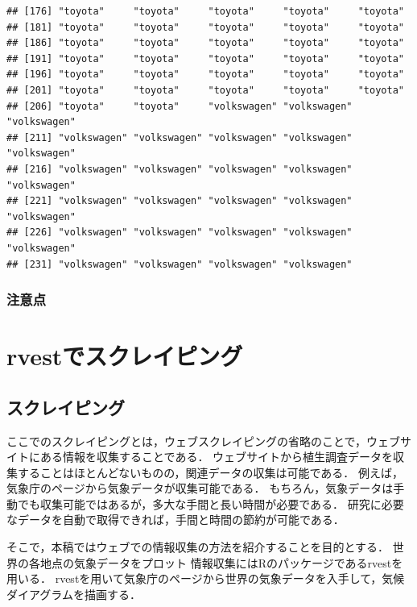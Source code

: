 \documentclass[
]{article}
\begin{document}
\begin{verbatim}
## [176] "toyota"     "toyota"     "toyota"     "toyota"     "toyota"    
## [181] "toyota"     "toyota"     "toyota"     "toyota"     "toyota"    
## [186] "toyota"     "toyota"     "toyota"     "toyota"     "toyota"    
## [191] "toyota"     "toyota"     "toyota"     "toyota"     "toyota"    
## [196] "toyota"     "toyota"     "toyota"     "toyota"     "toyota"    
## [201] "toyota"     "toyota"     "toyota"     "toyota"     "toyota"    
## [206] "toyota"     "toyota"     "volkswagen" "volkswagen" "volkswagen"
## [211] "volkswagen" "volkswagen" "volkswagen" "volkswagen" "volkswagen"
## [216] "volkswagen" "volkswagen" "volkswagen" "volkswagen" "volkswagen"
## [221] "volkswagen" "volkswagen" "volkswagen" "volkswagen" "volkswagen"
## [226] "volkswagen" "volkswagen" "volkswagen" "volkswagen" "volkswagen"
## [231] "volkswagen" "volkswagen" "volkswagen" "volkswagen"
\end{verbatim}

\hypertarget{ux6ce8ux610fux70b9-2}{%
\subsubsection{注意点}\label{ux6ce8ux610fux70b9-2}}

\hypertarget{rvest}{%
\section{rvestでスクレイピング}\label{rvest}}

\hypertarget{ux30b9ux30afux30ecux30a4ux30d4ux30f3ux30b0}{%
\subsection{スクレイピング}\label{ux30b9ux30afux30ecux30a4ux30d4ux30f3ux30b0}}

ここでのスクレイピングとは，ウェブスクレイピングの省略のことで，ウェブサイトにある情報を収集することである．
ウェブサイトから植生調査データを収集することはほとんどないものの，関連データの収集は可能である．
例えば，気象庁のページから気象データが収集可能である．
もちろん，気象データは手動でも収集可能ではあるが，多大な手間と長い時間が必要である．
研究に必要なデータを自動で取得できれば，手間と時間の節約が可能である．

そこで，本稿ではウェブでの情報収集の方法を紹介することを目的とする．
世界の各地点の気象データをプロット
情報収集にはRのパッケージであるrvestを用いる．
rvestを用いて気象庁のページから世界の気象データを入手して，気候ダイアグラムを描画する．
\end{document}
